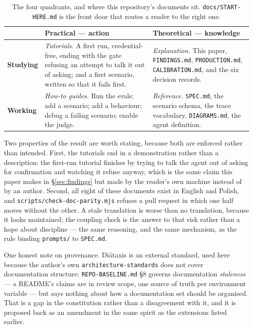 \documentclass[11pt,a4paper]{article}
\begin{document}
\begin{table}[htbp]
\centering
\small
\begin{tabularx}{\linewidth}{@{}lXX@{}}
\toprule
 & \textbf{Practical --- action} & \textbf{Theoretical --- knowledge} \\
\midrule
\textbf{Studying} &
\emph{Tutorials.} A first run, credential-free, ending with the gate refusing
an attempt to talk it out of asking; and a first scenario, written so that it
fails first. &
\emph{Explanation.} This paper, \texttt{FINDINGS.md}, \texttt{PRODUCTION.md},
\texttt{CALIBRATION.md}, and the six decision records. \\
\addlinespace
\textbf{Working} &
\emph{How-to guides.} Run the evals; add a scenario; add a behaviour; debug a
failing scenario; enable the judge. &
\emph{Reference.} \texttt{SPEC.md}, the scenario schema, the trace vocabulary,
\texttt{DIAGRAMS.md}, the agent definition. \\
\bottomrule
\end{tabularx}
\caption{The four quadrants, and where this repository's documents sit. \texttt{docs/START-HERE.md} is the front door that routes a reader to the right one.}
\label{tab:diataxis}
\end{table}

Two properties of the result are worth stating, because both are enforced
rather than intended. First, the tutorials end in a demonstration rather than a
description: the first-run tutorial finishes by trying to talk the agent out of
asking for confirmation and watching it refuse anyway, which is the same claim
this paper makes in \S\ref{sec:findings} but made by the reader's own machine
instead of by an author. Second, all eight of these documents exist in English
and Polish, and \texttt{scripts/check-doc-parity.mjs} refuses a pull request in
which one half moves without the other. A stale translation is worse than no
translation, because it looks maintained; the coupling check is the answer to
that risk rather than a hope about discipline --- the same reasoning, and the
same mechanism, as the rule binding \texttt{prompts/} to \texttt{SPEC.md}.

One honest note on provenance. Di\'{a}taxis is an external standard, used here
because the author's own \texttt{architecture-standards} does not cover
documentation structure: \texttt{REPO-BASELINE.md} \S8 governs documentation
\emph{staleness} --- a README's claims are in review scope, one source of truth
per environment variable --- but says nothing about how a documentation set
should be organised. That is a gap in the constitution rather than a
disagreement with it, and it is proposed back as an amendment in the same
spirit as the extensions listed earlier.
\end{document}
